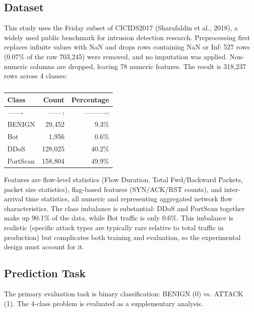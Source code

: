 \documentclass[10pt]{article}
\begin{document}
\subsection{Dataset}
This study uses the Friday subset of CICIDS2017 (Sharafaldin et al., 2018), a widely used public benchmark for intrusion detection research. Preprocessing first replaces infinite values with NaN and drops rows containing NaN or Inf: 527 rows (0.07\% of the raw 703,245) were removed, and no imputation was applied. Non-numeric columns are dropped, leaving 78 numeric features. The result is 318,237 rows across 4 classes:
\begin{table}[ht]
\centering
\small
\setlength{\tabcolsep}{5pt}
\caption{}
\begin{tabular}{l r r}
\toprule
Class & Count & Percentage \\
\midrule
------- & ------: & ----------: \\
BENIGN & 29,452 & 9.3\% \\
Bot & 1,956 & 0.6\% \\
DDoS & 128,025 & 40.2\% \\
PortScan & 158,804 & 49.9\% \\
\bottomrule
\end{tabular}
\end{table}
Features are flow-level statistics (Flow Duration, Total Fwd/Backward Packets, packet size statistics), flag-based features (SYN/ACK/RST counts), and inter-arrival time statistics, all numeric and representing aggregated network flow characteristics. The class imbalance is substantial: DDoS and PortScan together make up 90.1\% of the data, while Bot traffic is only 0.6\%. This imbalance is realistic (specific attack types are typically rare relative to total traffic in production) but complicates both training and evaluation, so the experimental design must account for it.
\subsection{Prediction Task}
The primary evaluation task is binary classification: BENIGN (0) vs. ATTACK (1). The 4-class problem is evaluated as a supplementary analysis.
\end{document}
